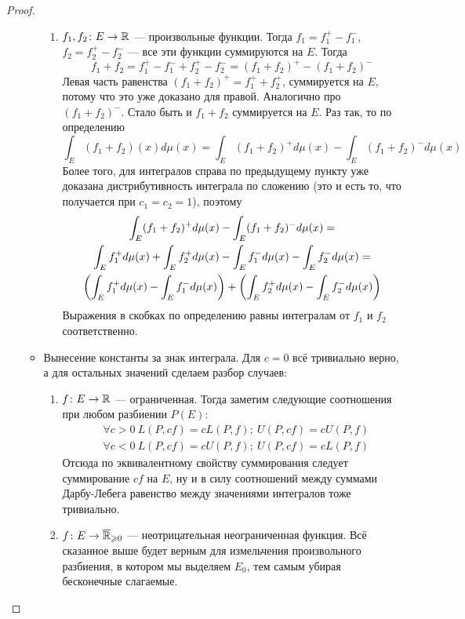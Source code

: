 \begin{proof}
\begin{enumerate}
\begin{itemize}
\begin{enumerate}
				\item $f_1, f_2 \colon E \to \mathbb{R}$ --- произвольные функции. Тогда $f_1 = f_1^+ - f_1^-$, $f_2 = f_2^+ - f_2^-$ --- все эти функции суммируются на $E$. Тогда
				\[
					f_1 + f_2 = f_1^+ - f_1^- + f_2^+ - f_2^- = (f_1 + f_2)^+ - (f_1 + f_2)^-
				\]
				Левая часть равенства $(f_1 + f_2)^+ = f_1^+ + f_2^+$, суммируется на $E$, потому что это уже доказано для правой. Аналогично про $(f_1 + f_2)^-$. Стало быть и $f_1 + f_2$ суммируется на $E$. Раз так, то по определению
				\[
					\int_E (f_1 + f_2)(x)d\mu(x) = \int_E (f_1 + f_2)^+ d\mu(x) - \int_E (f_1 + f_2)^- d\mu(x)
				\]
				Более того, для интегралов справа по предыдущему пункту уже доказана дистрибутивность интеграла по сложению (это и есть то, что получается при $c_1 = c_2 = 1$), поэтому
				\begin{multline*}
					\int_E (f_1 + f_2)^+ d\mu(x) - \int_E (f_1 + f_2)^- d\mu(x) =
					\\
					\int_E f_1^+ d\mu(x) + \int_E f_2^+ d\mu(x) - \int_E f_1^- d\mu(x) - \int_E f_2^- d\mu(x) =
					\\
					\left(\int_E f_1^+ d\mu(x) - \int_E f_1^- d\mu(x)\right) + \left(\int_E f_2^+ d\mu(x) - \int_E f_2^- d\mu(x)\right)
				\end{multline*}
				Выражения в скобках по определению равны интегралам от $f_1$ и $f_2$ соответственно.
			\end{enumerate}
		
			\item Вынесение константы за знак интеграла. Для $c = 0$ всё тривиально верно, а для остальных значений сделаем разбор случаев:
			\begin{enumerate}
				\item $f \colon E \to \mathbb{R}$ --- ограниченная. Тогда заметим следующие соотношения при любом разбиении $P(E)$:
				\begin{align*}
					&{\forall c > 0\ L(P, cf) = cL(P, f);\ U(P, cf) = cU(P, f)}
					\\
					&{\forall c < 0\ L(P, cf) = cU(P, f);\ U(P, cf) = cL(P, f)}
				\end{align*}
				Отсюда по эквивалентному свойству суммирования следует суммирование $cf$ на $E$, ну и в силу соотношений между суммами Дарбу-Лебега равенство между значениями интегралов тоже тривиально.
				
				\item $f \colon E \to \overline{\mathbb{R}}_{\geqslant 0}$ --- неотрицательная неограниченная функция. Всё сказанное выше будет верным для измельчения произвольного разбиения, в котором мы выделяем $E_0$, тем самым убирая бесконечные слагаемые.
				

\end{enumerate}
\end{itemize}
\end{enumerate}
\end{proof}
